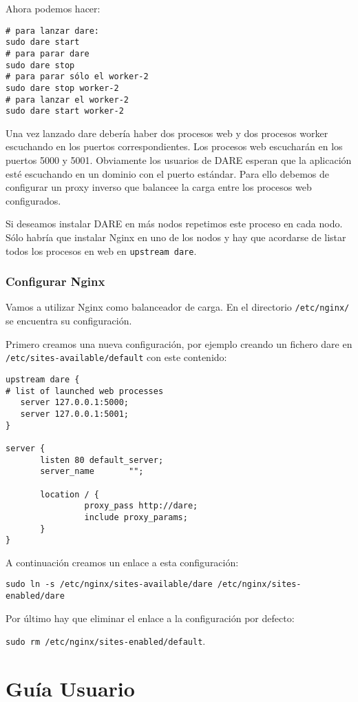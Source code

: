 Ahora podemos hacer:
\begin{verbatim}
# para lanzar dare:
sudo dare start
# para parar dare
sudo dare stop
# para parar sólo el worker-2
sudo dare stop worker-2
# para lanzar el worker-2
sudo dare start worker-2
\end{verbatim}
Una vez lanzado dare debería haber dos procesos web y dos procesos
worker escuchando en los puertos correspondientes. Los procesos web
escucharán en los puertos 5000 y 5001. Obviamente los usuarios de DARE
esperan que la aplicación esté escuchando en un dominio con el puerto
estándar. Para ello debemos de configurar un proxy inverso que balancee
la carga entre los procesos web configurados.

Si deseamos instalar DARE en más nodos repetimos este proceso en cada
nodo. Sólo habría que instalar Nginx en uno de los nodos y hay que
acordarse de listar todos los procesos en web en \verb+upstream dare+.

\subsubsection{Configurar Nginx}

Vamos a utilizar Nginx como balanceador de carga. En el directorio
\verb+/etc/nginx/+ se encuentra su configuración.

Primero creamos una nueva configuración, por ejemplo creando un
fichero dare en \verb+/etc/sites-available/default+ con este contenido:
\begin{verbatim}
upstream dare {
# list of launched web processes
   server 127.0.0.1:5000;
   server 127.0.0.1:5001;
}

server {
       listen 80 default_server;
       server_name       "";

       location / {
                proxy_pass http://dare;
                include proxy_params;
       }
}
\end{verbatim}

A continuación creamos un enlace a esta configuración:

\verb+sudo ln -s /etc/nginx/sites-available/dare /etc/nginx/sites-enabled/dare+

Por último hay que eliminar el enlace a la configuración por defecto:

\verb+sudo rm /etc/nginx/sites-enabled/default+.

\section{Guía Usuario}

